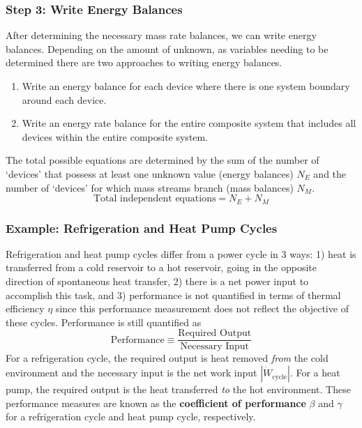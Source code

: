 \subsubsection{Step 3: Write Energy Balances}

After determining the necessary mass rate balances, we can write energy balances.  Depending on the amount of unknown, as variables needing to be determined there are two approaches to writing energy balances.
\begin{enumerate}
    \item Write an energy balance for each device where there is one system boundary around each device.
    \item Write an energy rate balance for the entire composite system that includes all devices within the entire composite system.
\end{enumerate}

The total possible equations are determined by the sum of the number of `devices' that possess at least one unknown value (energy balances) $N_E$ and the number of `devices' for which mass streams branch (mass balances) $N_M$.
\begin{equation}
\text{Total independent equations} = N_E + N_M
\end{equation}

\subsubsection{Example: Refrigeration and Heat Pump Cycles}
Refrigeration and heat pump cycles differ from a power cycle in $3$ ways: 1) heat is transferred from a cold reservoir to a hot reservoir, going in the opposite direction of spontaneous heat transfer, 2) there is a net power input to accomplish this task, and 3) performance is not quantified in terms of thermal efficiency $\eta$ since this performance measurement does not reflect the objective of these cycles. Performance is still quantified as
\begin{equation}\label{eq:performance}
\text{Performance} \equiv \frac{\textrm{Required Output}}{\textrm{Necessary Input}}
\end{equation}
For a refrigeration cycle, the required output is heat removed \emph{from} the cold environment and the necessary input is the net work input $|\dot{W}_{\text{cycle}}|$. For a heat pump, the required output is the heat transferred \emph{to} the hot environment. These performance measures are known as the \textbf{coefficient of performance} $\beta$ and $\gamma$ for a refrigeration cycle and heat pump cycle, respectively. 

